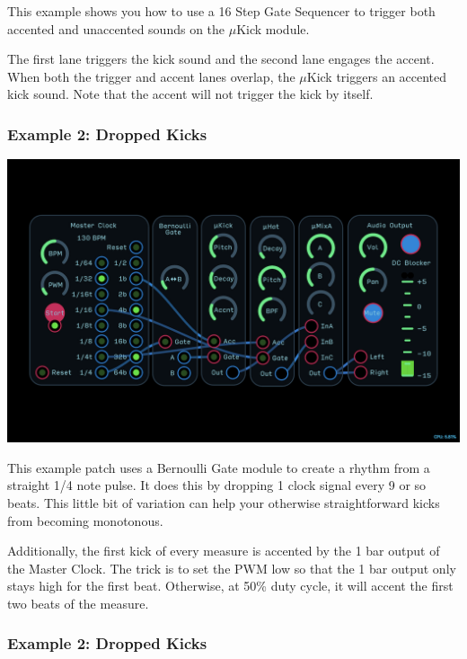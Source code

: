 \documentclass[11pt]{book}
\begin{document}
\begin{multicols*}{2}
This example shows you how to use a 16 Step Gate Sequencer to trigger both accented and unaccented sounds on the $\mu$Kick module.

The first lane triggers the kick sound and the second lane engages the accent. When both the trigger and accent lanes overlap, the $\mu$Kick triggers an accented kick sound. Note that the accent will not trigger the kick by itself.

\subsubsection*{Example 2: Dropped Kicks}

\begin{center}
\includegraphics[width=0.95\linewidth]{ukick-fig2.png}
\end{center}

This example patch uses a Bernoulli Gate module to create a rhythm from a straight 1/4 note pulse. It does this by dropping 1 clock signal every 9 or so beats. This little bit of variation can help your otherwise straightforward kicks from becoming monotonous.

Additionally, the first kick of every measure is accented by the 1 bar output of the Master Clock. The trick is to set the PWM low so that the 1 bar output only stays high for the first beat. Otherwise, at 50\% duty cycle, it will accent the first two beats of the measure.

\subsubsection*{Example 2: Dropped Kicks}


\end{multicols*}
\end{document}
